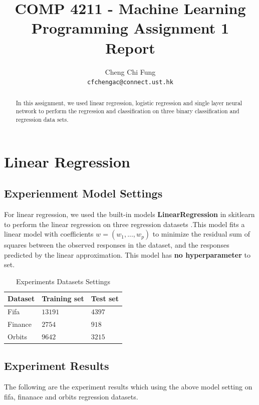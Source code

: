 \documentclass{article}
\title{COMP 4211 - Machine Learning Programming Assignment 1 Report}
\author{%
	Cheng Chi Fung \\
	\texttt{cfchengac@connect.ust.hk} \\
}
\begin{document}
\maketitle

\begin{abstract}
  In this assignment, we used linear regression, logistic regression and single layer neural network to perform the regression and classification on three binary classification and regression data sets.
  
\end{abstract}

\section{Linear Regression}

\subsection{Experienment Model Settings}

For linear regression, we used the built-in models   \textbf{LinearRegression} in skitlearn to perform the linear regression on three regression datasets .This model fits a linear model with coefficients  	$w = (w_1,..., w_p)$  to minimize the residual sum of squares between the observed responses in the dataset, and the responses predicted by the linear approximation. This model has \textbf{no hyperparameter} to set.

\begin{table}[htb]
	\caption{Experiments Datasets Settings}
	\label{sample-table}
	\centering
	\begin{tabular}{lll}
		\toprule
		\cmidrule{1-3}
		Dataset & Training set & Test set \\
		\midrule
		Fifa & $13191$ & $4397$ \\
		Finance & $2754$ & $918$ \\
		Orbits & $9642$ & $3215$ \\
		\bottomrule
	\end{tabular}
\end{table}

\subsection{Experiment Results}

The following are the experiment results which using the above model setting on fifa, finanace and orbits regression datasets.
\end{document}
